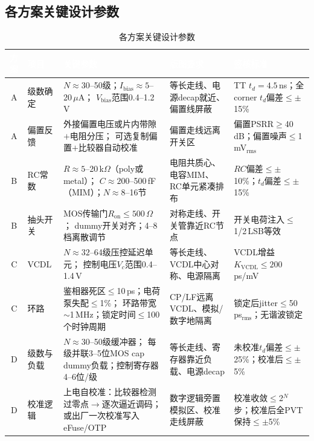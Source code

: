 \documentclass[12pt,a4paper,fontset=none]{ctexart}
\newcommand{\needtable}{\needspace{6cm}}   %
\begin{document}
\needtable
\subsection{各方案关键设计参数}

\begin{table}[H]
\centering
\caption{各方案关键设计参数}
\scriptsize
\begin{tabular}{@{}cL{1.4cm}L{2.6cm}L{2.8cm}L{3.4cm}@{}}
\toprule
{}
\textcolor{white}{\textbf{方案}} &
\textcolor{white}{\textbf{项目}} &
\textcolor{white}{\textbf{关键参数}} &
\textcolor{white}{\textbf{版图要求}} &
\textcolor{white}{\textbf{签核标准}} \\
\midrule
A & 级数确定 & $N\!\approx\!30$--50级；$I_{\mathrm{bias}}\!\approx\!5$--20\,$\mu$A；
$V_{\mathrm{bias}}$范围0.4--1.2\,V & 等长走线、电源decap就近、偏置线屏蔽 &
TT $t_d\!=\!4.5$\,ns；全corner $t_d$偏差$\le\pm$15\% \\
A & 偏置反馈 & 外接偏置电压或片内带隙$+$电阻分压；
可选复制偏置$+$比较器自动校准 & 偏置走线远离开关区 &
偏置PSRR$\ge$40\,dB；偏置噪声$\le$1\,mV$_{\mathrm{rms}}$ \\
\midrule
B & RC常数 & $R\!\approx\!5$--20\,k$\Omega$（poly或metal）；
$C\!\approx\!200$--500\,fF（MIM）；$N\!\approx\!8$--16节 &
电阻共质心、电容MIM、RC单元紧凑排布 &
$RC$偏差$\le\pm$10\%；$t_d$偏差$\le\pm$15\% \\
B & 抽头开关 & MOS传输门$R_{\mathrm{on}}\!\le\!500\,\Omega$；
dummy开关对齐；4--8档离散调节 & 对称走线、开关管靠近RC节点 &
开关电荷注入$\le$1/2\,LSB等效 \\
\midrule
C & VCDL & $N\!\approx\!32$--64级压控延迟单元；
控制电压$V_c$范围0.4--1.4\,V & 等长走线、VCDL中心对称、电源隔离 &
VCDL增益$K_{\mathrm{VCDL}}\!\le\!200$\,ps/mV \\
C & 环路 & 鉴相器死区$\le$10\,ps；电荷泵失配$\le$1\%；
环路带宽$\sim$1\,MHz；锁定时间$\le$100个时钟周期 &
CP/LF远离VCDL、模拟/数字地隔离 &
锁定后jitter$\le$50\,ps$_{\mathrm{rms}}$；无谐波锁定 \\
\midrule
D & 级数与负载 & $N\!\approx\!30$--50级缓冲器；
每级并联3--5位MOS cap dummy负载；控制寄存器4--6位/级 &
等长走线、寄存器靠近负载、电源decap &
未校准$t_d$偏差$\le\pm$25\%；校准后$\le\pm$5\% \\
D & 校准逻辑 & 上电自校准：比较器检测过零点$\to$逐次逼近调码；
或出厂一次校准写入eFuse/OTP &
数字逻辑旁置模拟区、校准走线屏蔽 &
校准收敛$\le$2$^N$步；校准后全PVT保持$\le\pm$5\% \\
\bottomrule
\end{tabular}
\end{table}
\end{document}
